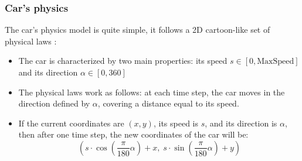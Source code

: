 \documentclass[11pt,a4paper]{article}
\begin{document}
			\subsubsection*{Car's physics}
The car's physics model is quite simple, it follows a 2D cartoon-like set of physical laws :
\begin{itemize}
    \item The car is characterized by two main properties: its speed $s \in [0, \text{MaxSpeed}]$ and its direction $\alpha \in [0, 360]$
    \item The physical laws work as follows: at each time step, the car moves in the direction defined by $\alpha$, covering a distance equal to its speed.
    \item If the current coordinates are $(x, y)$, its speed is $s$, and its direction is $\alpha$, then after one time step, the new coordinates of the car will be:
    \[
    (s \cdot \cos\left(\frac{\pi}{180}\alpha\right) + x,\; s \cdot \sin\left(\frac{\pi}{180}\alpha\right) + y)
    \]
\end{itemize}
\end{document}
